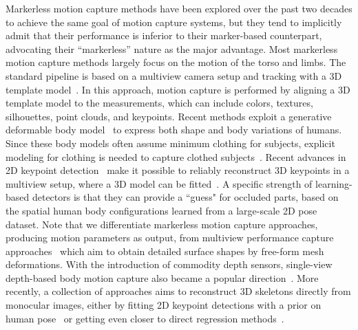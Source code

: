 Markerless motion capture methods have been explored over the past two decades to achieve the same goal of motion capture systems, but they tend to implicitly admit that their performance is inferior to their marker-based counterpart, advocating their ``markerless'' nature as the major advantage. Most markerless motion capture methods largely focus on the motion of the torso and limbs. The standard pipeline is based on a multiview camera setup and tracking with a 3D template model~\cite{Liu-2013, Gavrila-96, Cheung-05, Bregler-04, Kehl-06, Corazza-10, Vlasic-08, Brox-10, Stoll-11, de2008performance, Elhayek-15}. In this approach, motion capture is performed by aligning a 3D template model to the measurements, which can include colors, textures, silhouettes, point clouds, and keypoints. Recent methods exploit a generative deformable body model~\cite{anguelov2005scape, Loper2015, pons2015dyna} to express both shape and body variations of humans. Since these body models often assume minimum clothing for subjects, explicit modeling for clothing is needed to capture clothed subjects~\cite{zhang2017detailed, pons2017clothcap}. Recent advances in 2D keypoint detection~\cite{ Newell-16, cao2017realtime, Wei2016} make it possible to reliably reconstruct 3D keypoints in a multiview setup, where a 3D model can be fitted~\cite{Elhayek-15, Joo-15, joo2017panoptic}. A specific strength of learning-based detectors is that they can provide a ``guess"  for occluded parts, based on the spatial human body configurations learned from a large-scale 2D pose dataset. Note that we differentiate markerless motion capture approaches, producing motion parameters as output, from multiview performance capture approaches~\cite{Vlasic-2009, Furukawa-2008} which aim to obtain detailed surface shapes by free-form mesh deformations. With the introduction of commodity depth sensors, single-view depth-based body motion capture also became a popular direction~\cite{Baak2011, Shotton2011}. More recently, a collection of approaches aims to reconstruct 3D skeletons directly from monocular images, either by fitting 2D keypoint detections with a prior on human pose~\cite{Zhou2015,Bogo2016} or getting even closer to direct regression methods~\cite{Zhou2016,Mehta2017,tome2017lifting}.

